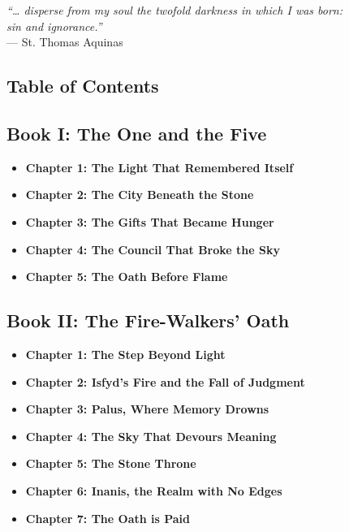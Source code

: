 \documentclass[12pt]{article}
\begin{document}
\newpage

\begin{titlepage}
\vspace*{\fill}
\begin{center}
\emph{“… disperse from my soul the twofold darkness in which I was born:} \\
\emph{sin and ignorance.”} \\
\vspace{1em}
— St. Thomas Aquinas
\end{center}
\vspace*{\fill}
\end{titlepage}


\newpage

\begin{titlepage}
\section*{Table of Contents}

\vspace{.5in}

\subsection*{Book I: The One and the Five}
\begin{itemize}
  \item \textbf{Chapter 1: The Light That Remembered Itself}
  \item \textbf{Chapter 2: The City Beneath the Stone}
  \item \textbf{Chapter 3: The Gifts That Became Hunger}
  \item \textbf{Chapter 4: The Council That Broke the Sky}
  \item \textbf{Chapter 5: The Oath Before Flame}
\end{itemize}

\vspace{.5in}

\subsection*{Book II: The Fire-Walkers’ Oath}
\begin{itemize}
  \item \textbf{Chapter 1: The Step Beyond Light}
  \item \textbf{Chapter 2: Isfyd’s Fire and the Fall of Judgment}
  \item \textbf{Chapter 3: Palus, Where Memory Drowns}
  \item \textbf{Chapter 4: The Sky That Devours Meaning}
  \item \textbf{Chapter 5: The Stone Throne}
  \item \textbf{Chapter 6: Inanis, the Realm with No Edges}
  \item \textbf{Chapter 7: The Oath is Paid}
\end{itemize}
\end{titlepage}
\end{document}
